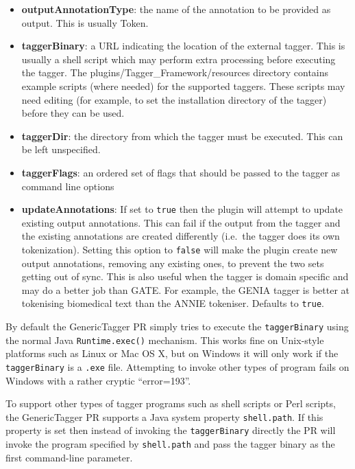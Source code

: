 \begin{itemize}
\begin{itemize}
         (i.e.\ un-named) annotation set will be used.
      \item \textbf{outputAnnotationType}: the name of the annotation to be provided as output. This is usually Token.
      \item \textbf{taggerBinary}: a URL indicating the location of the external tagger. This is usually a shell script
         which may perform extra processing before executing the tagger. The plugins/Tagger\_Framework/resources directory
         contains example scripts (where needed) for the supported taggers. These scripts may need editing (for example,
         to set the installation directory of the tagger) before they can be used.
      \item \textbf{taggerDir}: the directory from which the tagger must be executed. This can be left unspecified.
      \item \textbf{taggerFlags}: an ordered set of flags that should be passed to the tagger as command line options
      \item \textbf{updateAnnotations}: If set to \texttt{true} then the plugin will attempt to update existing output annotations. This can fail
         if the output from the tagger and the existing annotations are created differently (i.e.\ the tagger does its own tokenization).
         Setting this option to \texttt{false} will make the plugin create new output annotations, removing any existing ones, to prevent
         the two sets getting out of sync. This is also useful when the tagger is domain specific and may do a better job than GATE. For example,
         the GENIA tagger is better at tokenising biomedical text than the ANNIE tokeniser. Defaults to \texttt{true}.
   \end{itemize}
\end{itemize}

By default the GenericTagger PR simply tries to execute the
\texttt{taggerBinary} using the normal Java \texttt{Runtime.exec()} mechanism.
This works fine on Unix-style platforms such as Linux or Mac OS X, but on
Windows it will only work if the \texttt{taggerBinary} is a \texttt{.exe} file.
Attempting to invoke other types of program fails on Windows with a rather
cryptic ``error=193''.

To support other types of tagger programs such as shell scripts or Perl
scripts, the GenericTagger PR supports a Java system property
\texttt{shell.path}.  If this property is set then instead of invoking the
\texttt{taggerBinary} directly the PR will invoke the program specified by
\texttt{shell.path} and pass the tagger binary as the first command-line
parameter.

